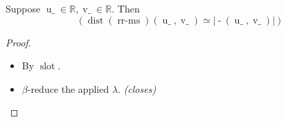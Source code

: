 \begin{proposition}[rr-ms-dist]
Suppose $\operatorname{u\_} \in \mathbb{R}, \operatorname{v\_} \in \mathbb{R}$. Then
\begin{equation*}
(\operatorname{dist}(\operatorname{rr\text{-}ms})(\operatorname{u\_}, \operatorname{v\_}) \simeq \lvert \operatorname{\text{-}}(\operatorname{u\_}, \operatorname{v\_}) \rvert)
\end{equation*}

\end{proposition}

\begin{proof}
\begin{itemize}
  \item[\textbf{4}] By $\operatorname{slot}$.
  \item[\textbf{5--6}] $\beta$-reduce the applied $\lambda$.  \emph{(closes)}
\end{itemize}
\end{proof}
